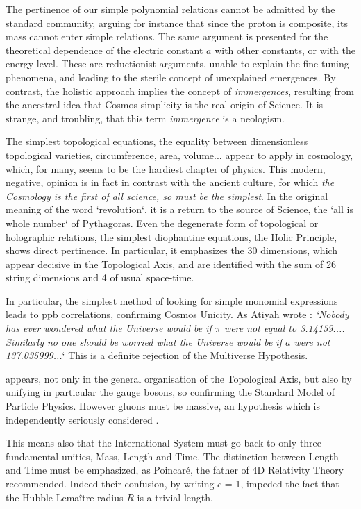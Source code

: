 \documentclass[twoside,draft]{article}
\begin{document}
\begin{sloppypar}
The pertinence of our simple polynomial relations cannot be admitted by the standard community, arguing for instance that since the proton is composite, its mass cannot enter simple relations. The same argument is presented for the theoretical dependence of the electric constant $a$ with other constants, or with the energy level. These are reductionist arguments, unable to explain the fine-tuning phenomena, and leading to the sterile concept of unexplained emergences. By contrast, the holistic approach implies the concept of \textit{immergences}, resulting from the ancestral idea that Cosmos simplicity is the real origin of Science. It is strange, and troubling, that this term \textit{immergence} is a neologism.

The simplest topological equations, the equality between dimensionless topological varieties,
circumference, area, volume... appear to apply in cosmology, which, for many, seems to be the hardiest
chapter of physics. This modern, negative, opinion is in fact in contrast with the ancient culture, for
which \textit{the Cosmology is the first of all science, so must be the simplest}. In the original meaning of the
word `revolution`, it is a return to the source of Science, the `all is whole number` of Pythagoras.
Even the degenerate form of topological or holographic relations, the simplest diophantine
equations, the Holic Principle, shows direct pertinence. In particular, it emphasizes the 30
dimensions, which appear decisive in the Topological Axis, and are identified with the sum of 26 string
dimensions and 4 of usual space-time.

In particular, the simplest method of looking for simple monomial expressions leads to ppb correlations, confirming Cosmos Unicity. As Atiyah wrote \cite{Atiyah1}: \textit{`Nobody has
ever wondered what the Universe would be if $\pi$ were not equal to 3.14159.... Similarly no one
should be worried what the Universe would be if $a$ were not 137.035999...}` This is a definite
rejection of the Multiverse Hypothesis.

appears, not only in the general organisation of the Topological Axis, but also by unifying in particular the gauge bosons, so confirming the Standard Model of Particle Physics. However gluons must be massive, an hypothesis which is independently seriously considered \cite{Larin}.

This means also that the International System must go back to only three fundamental unities,
Mass, Length and Time. The distinction between Length and Time must be emphasized, as
Poincar\'{e}, the father of 4D Relativity Theory recommended. Indeed their confusion, by writing $c$ =
1, impeded the fact that the Hubble-Lema\^{i}tre radius $R$ is a trivial length.



\end{sloppypar}
\end{document}
